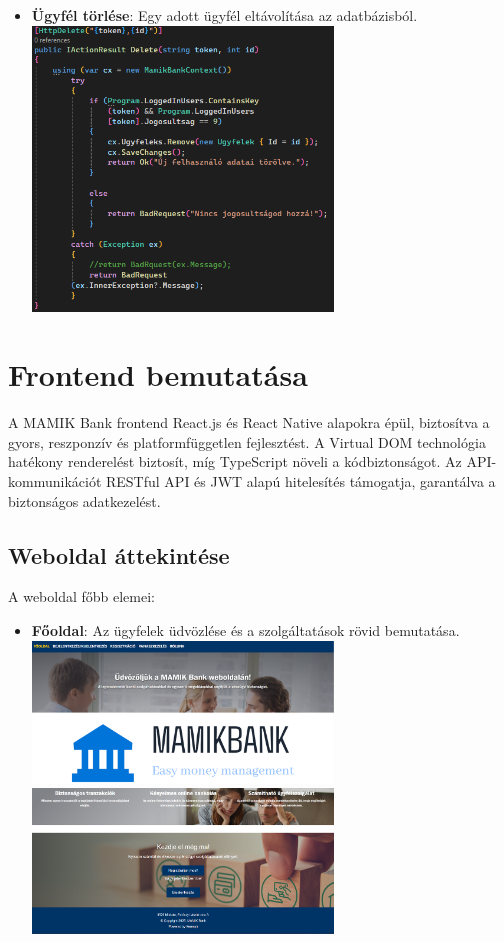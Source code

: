 \documentclass[colorlinks]{thesis-kando}
\theoremstyle{definition}
\theoremstyle{remark}
\begin{document}
\begin{itemize}
\begin{itemize}
    \item \textbf{Ügyfél törlése}: Egy adott ügyfél eltávolítása az adatbázisból.
    \\
    \includegraphics[width=8cm]{figures/ugyfeltorles.png}
\end{itemize}
\newpage
\section{Frontend bemutatása}
A MAMIK Bank frontend React.js és React Native alapokra épül, biztosítva a gyors, reszponzív és platformfüggetlen fejlesztést. A Virtual DOM technológia hatékony renderelést biztosít, míg TypeScript növeli a kódbiztonságot.  Az API-kommunikációt RESTful API és JWT alapú hitelesítés támogatja, garantálva a biztonságos adatkezelést.
\subsection{Weboldal áttekintése}
A weboldal főbb elemei:
\begin{itemize}
    \item \textbf{Főoldal}: Az ügyfelek üdvözlése és a szolgáltatások rövid bemutatása.
    \\
     \includegraphics[width=8cm]{figures/Fooldal1.png}
    \includegraphics[width=8cm]{figures/Fooldal2.png}


\end{itemize}
\end{itemize}
\end{document}
